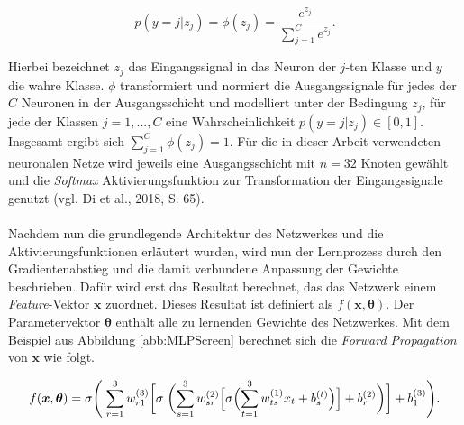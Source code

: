 \documentclass[a4paper,11pt]{article}
\begin{document}
\[p(y = j |z_j) = \phi(z_j) = \frac{e^{z_j}}{\sum_{j=1}^C e^{z_j}} .\]

Hierbei bezeichnet $z_j$ das Eingangssignal in das Neuron der $j$-ten Klasse und $y$ die wahre Klasse. $\phi$ transformiert und normiert die Ausgangssignale für jedes der $C$ Neuronen in der Ausgangsschicht und modelliert unter der Bedingung $z_j$, für jede der Klassen $j = 1,..., C$ eine Wahrscheinlichkeit $p(y=j|z_j) \in \left[0, 1\right]$. Insgesamt ergibt sich $\sum_{j = 1}^C \phi(z_j) = 1$. Für die in dieser Arbeit verwendeten neuronalen Netze wird jeweils eine Ausgangsschicht mit $n = 32$ Knoten gewählt und die \textit{Softmax} Aktivierungsfunktion zur Transformation der Eingangssignale genutzt (vgl. Di et al., 2018, S. 65).\\
\\
Nachdem nun die grundlegende Architektur des Netzwerkes und die Aktivierungsfunktionen erläutert wurden, wird nun der Lernprozess durch den Gradientenabstieg und die damit verbundene Anpassung der Gewichte beschrieben. Dafür wird erst das Resultat berechnet, das das Netzwerk einem \textit{Feature}-Vektor $\bm{x}$ zuordnet. Dieses Resultat ist definiert als $f(\bm{x}, \bm{\theta})$. Der Parametervektor $\bm{\theta}$ enthält alle zu lernenden Gewichte des Netzwerkes. Mit dem Beispiel aus Abbildung \ref{abb:MLPScreen} berechnet sich die \textit{Forward Propagation} von $\bm{x}$ wie folgt. 

\begin{equation}\label{eq:ForwardProp}
 f(\bm{x}, \bm{\theta}) = \sigma \Biggl( \hspace{0.1cm}  \sum_{r=1}^{3}  w_{r1}^{(3)} \biggl[ \sigma \hspace{0.1cm} \biggl(\sum_{s=1}^{3} w_{sr}^{(2)} \Bigl[ \sigma \Bigl( \sum_{t=1}^{3} w_{ts}^{(1)} x_{t} + b_s^{(t)} \Bigr) \Bigr]  + b_r^{(2)} \biggr)  \biggr] + b_1^{(3)} \Biggr).    
\end{equation}{}
\end{document}
